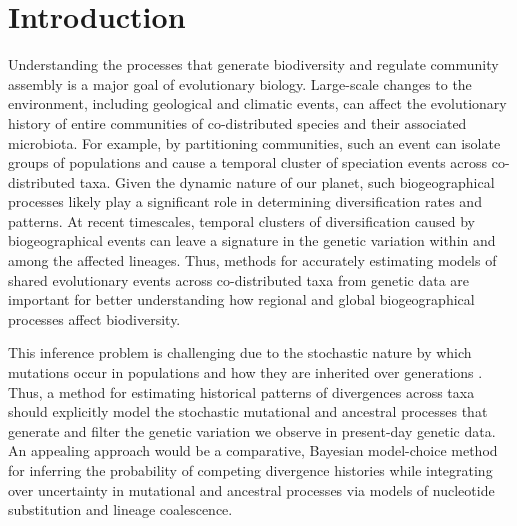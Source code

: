 \section{Introduction}

Understanding the processes that generate biodiversity and regulate
community assembly is a major goal of evolutionary biology.
Large-scale changes to the environment, including geological and climatic
events, can affect the evolutionary history of entire communities of
co-distributed species and their associated microbiota.
For example, by partitioning communities, such an event can isolate groups of
populations and cause a temporal cluster of speciation events across
co-distributed taxa.
Given the dynamic nature of our planet, such biogeographical processes likely
play a significant role in determining diversification rates and patterns.
At recent timescales, temporal clusters of diversification caused by
biogeographical events can leave a signature in the genetic variation within
and among the affected lineages.
Thus, methods for accurately estimating models of shared evolutionary events
across co-distributed taxa from genetic data are important for better
understanding how regional and global biogeographical processes affect
biodiversity.

This inference problem is challenging due to the stochastic nature by which
mutations occur in populations and how they are inherited over generations
\citep{Hudson1990,WakeleyCoalescent}.
Thus, a method for estimating historical patterns of divergences across taxa
should explicitly model the stochastic mutational and ancestral processes that
generate and filter the genetic variation we observe in present-day genetic
data.
An appealing approach would be a comparative, Bayesian model-choice method for
inferring the probability of competing divergence histories while integrating
over uncertainty in mutational and ancestral processes via models of nucleotide
substitution and lineage coalescence.

